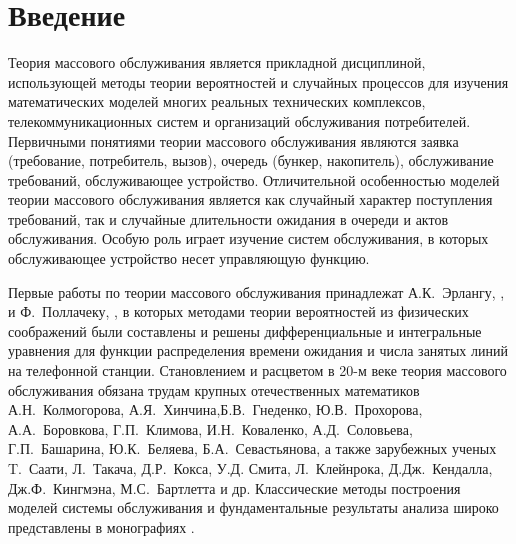 \documentclass{report}
\begin{document}
\tableofcontents

\setcounter{page}{2}

\section*{Введение}

Теория массового обслуживания является прикладной дисциплиной, использующей методы теории вероятностей и случайных процессов для  изучения математических моделей многих реальных технических комплексов, телекоммуникационных систем и организаций обслуживания потребителей. 
Первичными понятиями теории массового обслуживания являются заявка (требование, потребитель, вызов), очередь (бункер, накопитель), обслуживание требований, обслуживающее устройство.
Отличительной особенностью моделей теории массового обслуживания является как случайный характер поступления требований, так и случайные длительности ожидания в очереди и актов обслуживания.
Особую роль играет изучение систем обслуживания, в которых обслуживающее устройство несет управляющую функцию.

Первые работы по теории массового обслуживания принадлежат А.К.~Эрлангу, \cite{Erlang:1909, Erlang:1917}, и Ф.~Поллачеку, \cite{Pollaczek:1934}, в которых методами теории вероятностей из физических соображений были составлены и решены дифференциальные и интегральные уравнения для функции распределения времени ожидания и числа занятых линий на телефонной станции. 
Становлением и расцветом в 20-м веке теория массового обслуживания обязана трудам крупных отечественных математиков 
 А.Н.~Колмогорова, А.Я.~Хинчина,Б.В.~Гнеденко, Ю.В.~Прохорова, А.А.~Боровкова, Г.П.~Климова, И.Н.~Коваленко, А.Д.~Соловьева, Г.П.~Башарина,  Ю.К.~Беляева, Б.А.~Севастьянова,
а также зарубежных ученых T.~Саати, Л.~Такача, Д.Р.~Кокса, У.Д. Смита, Л.~Клейнрока, Д.Дж.~Кендалла, Дж.Ф.~Кингмэна,  М.С.~Бартлетта и др. 
Классические методы построения моделей системы обслуживания и фундаментальные результаты анализа широко представлены в монографиях \cite{Hinchin:2010, Klimov:1966, Gnedenko:2012, Saati:1971, Bocharov:1995, Asmussen:2008, Borovkov:1972, Borovkov:1980}.
\end{document}
